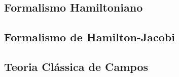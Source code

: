\documentclass[twoside]{amsart}
\numberwithin{equation}{section}
\begin{document}

\begin{refsection}
\section{Formalismo Hamiltoniano}


\printbibliography[heading=subbibliography]
\end{refsection}


\begin{refsection}
\section{Formalismo de Hamilton-Jacobi}

\printbibliography[heading=subbibliography]
\end{refsection}


\begin{refsection}
\section{Teoria Clássica de Campos}



\printbibliography[heading=subbibliography]
\end{refsection}

\end{document}
